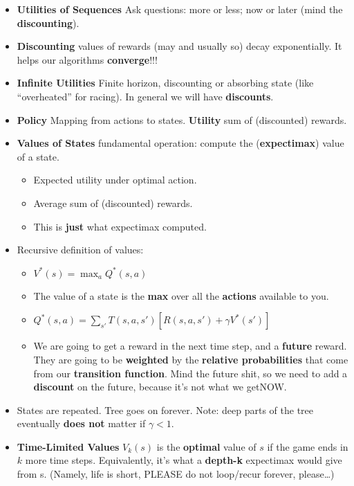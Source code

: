 \documentclass[twocolumn]{article}
\begin{document}
\begin{itemize}
\item \textbf{Utilities of Sequences} Ask questions: more or less; now
  or later (mind the \textbf{discounting}). 
\item \textbf{Discounting} values of rewards (may and usually so)
  decay exponentially. It helps our algorithms \textbf{converge}!!!
\item \textbf{Infinite Utilities} Finite horizon, discounting or
  absorbing state (like ``overheated'' for racing). In general we will
  have \textbf{discounts}.
\item \textbf{Policy} Mapping from actions to states. \textbf{Utility}
  sum of (discounted) rewards.
\item \textbf{Values of States} fundamental operation: compute the
  (\textbf{expectimax}) value of a state. 
  \begin{itemize}
  \item Expected utility under optimal action.
  \item Average sum of (discounted) rewards.
  \item This is \textbf{just} what expectimax computed.
  \end{itemize}
\item Recursive definition of values:
  \begin{itemize}
  \item $V^{*}(s)={\displaystyle\max_{a}}Q^{*}(s,a)$
  \item The value of a state is the \textbf{max} over all the
    \textbf{actions} available to you.
  \item $Q^{*}(s,a)=\sum_{s'}T(s,a,s')[R(s,a,s')+\gamma V^{*}(s')]$
  \item We are going to get a reward in the next time step, and a
    \textbf{future} reward. They are going to be \textbf{weighted} by
    the \textbf{relative probabilities} that come from our
    \textbf{transition function}. Mind the future shit, so we need to
    add a \textbf{discount} on the future, because it's not what we
    get\@ NOW.
  \end{itemize}
\item States are repeated. Tree goes on forever. Note: deep parts of
  the tree eventually \textbf{does not} matter if $\gamma < 1$.
\item \textbf{Time-Limited Values} $V_{k}(s)$ is the \textbf{optimal}
  value of $s$ if the game ends in $k$ more time steps. Equivalently,
  it's what a \textbf{depth-k} expectimax would give from s. (Namely,
  life is short, PLEASE do not loop/recur forever, please\ldots)

\end{itemize}
\end{document}
